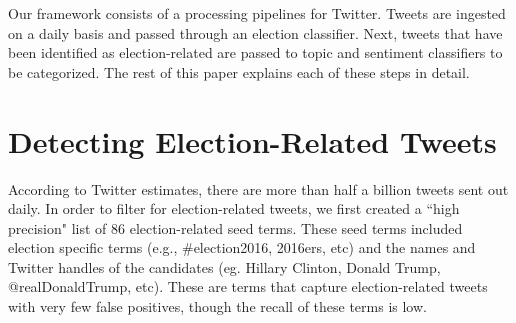 \documentclass[letterpaper]{article}
\begin{document}
Our framework consists of a processing pipelines for Twitter. Tweets are ingested on a daily basis and passed through an election classifier. Next, tweets that have been identified as election-related are passed to topic and sentiment classifiers to be categorized. The rest of this paper explains each of these steps in detail. %














\section{Detecting Election-Related Tweets}
According to Twitter estimates, there are more than half a billion tweets sent out daily. In order to filter for election-related tweets, we first created a ``high precision" list of 86 election-related seed terms. These seed terms included election specific terms (e.g., \#election2016, 2016ers, etc) and the names and Twitter handles of the candidates (eg. Hillary Clinton, Donald Trump, @realDonaldTrump, etc). These are terms that capture election-related tweets with very few false positives, though the recall of these terms is low. 
\end{document}
